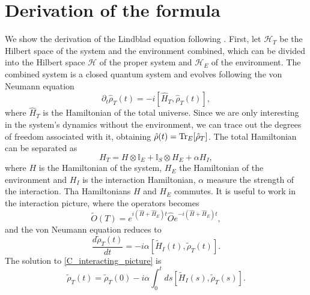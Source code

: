 \section{Derivation of the formula}
We show the derivation of the Lindblad equation following \cite{Manzano,Breuer-Petruccione}.
First, let $\mathcal{H}_T$ be the Hilbert space of the system and the environment combined, which can be divided into the Hilbert space $\mathcal{H}$ of the proper system and $\mathcal{H}_E$ of the environment. The combined system is a closed quantum system and evolves following the von Neumann equation 
\begin{equation}
    \partial_t\hat\rho_T(t) = -i[\hat H_T,\hat\rho_T(t)],
\end{equation}
where $\hat H_T$ is the Hamiltonian of the total universe.
Since we are only interesting in the system's dynamics without the environment, we can trace out the degrees of freedom associated with it, obtaining $\hat\rho(t) = \operatorname{Tr}_E[\hat\rho_T]$. The total Hamiltonian can be separated as 
\begin{equation}
    H_T = H \otimes \mathbb{I}_E + \mathbb{I}_S \otimes H_E + \alpha H_I,
\end{equation}
where $H$ is the Hamiltonian of the system, $H_E$ the Hamiltonian of the environment and $H_I$ is the interaction Hamiltonian, $\alpha$  measure the strength of the interaction. Tha Hamiltonians $H$ and $H_E$ commutes.
It is useful to work in the interaction picture, where the operators becomes
\begin{equation}
    \tilde O(T) = e^{i(\hat H+\hat H_E)t}\hat O e^{-i(\hat H+\hat H_E)t},
\end{equation}
and the von Neumann equation reduces to 
\begin{equation}\label{C_interacting_picture}
    \frac{d\tilde\rho_T(t)}{dt}= -i\alpha\left[\tilde H_I(t),\tilde\rho_T(t)\right].
\end{equation}  
The solution to \eqref{C_interacting_picture} is 
\begin{equation}\label{interacting_picture_exact_solution}
    \tilde\rho_T(t) = \tilde\rho_T(0) -i\alpha\int_{0}^{t}ds\left[\tilde H_I(s),\tilde\rho_T(s)\right].
\end{equation}


